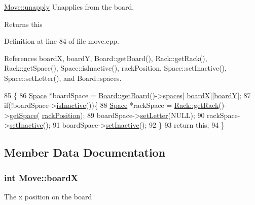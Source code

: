 \hyperlink{class_move_a2ca5c1f8be73c0e6c0ec4b359061a1e2}{Move\-::unapply} Unapplies from the board. 

\begin{DoxyReturn}{Returns}
this 
\end{DoxyReturn}


Definition at line 84 of file move.\-cpp.



References board\-X, board\-Y, Board\-::get\-Board(), Rack\-::get\-Rack(), Rack\-::get\-Space(), Space\-::is\-Inactive(), rack\-Position, Space\-::set\-Inactive(), Space\-::set\-Letter(), and Board\-::spaces.


\begin{DoxyCode}
85 \{
86     \hyperlink{class_space}{Space} *boardSpace = \hyperlink{class_board_ae30e802b1d83309fc95e695b5b3df338}{Board::getBoard}()->\hyperlink{class_board_a73b12248ddb6ee3adc24f4458d8661c2}{spaces}[
      \hyperlink{class_move_ad3fa58a6db17896f2a83cbcc77ceb998}{boardX}][\hyperlink{class_move_ac953ac3b9b8ca529d1be967c7712ae05}{boardY}];
87     \textcolor{keywordflow}{if}(!boardSpace->\hyperlink{class_space_a83819948ab0508299c66829ca8335034}{isInactive}())\{
88         \hyperlink{class_space}{Space} *rackSpace = \hyperlink{class_rack_aa48de650c15bda8267451d84caf6ea3f}{Rack::getRack}()->\hyperlink{class_rack_a2fdfa2264bb85c08ebf107e67cfc8657}{getSpace}(
      \hyperlink{class_move_a8a1c46caedcac551e4a6714b7b729a41}{rackPosition});
89         boardSpace->\hyperlink{class_space_aab86690461768d190a009e06c753f2ce}{setLetter}(NULL);
90         rackSpace->\hyperlink{class_space_a8f6b89f570c1e0ca3c34f19df439a598}{setInactive}();
91         boardSpace->\hyperlink{class_space_a8f6b89f570c1e0ca3c34f19df439a598}{setInactive}();
92     \}
93     \textcolor{keywordflow}{return} \textcolor{keyword}{this};
94 \}
\end{DoxyCode}


\subsection{Member Data Documentation}
\hypertarget{class_move_ad3fa58a6db17896f2a83cbcc77ceb998}{
\subsubsection[{board\-X}]{\setlength{\rightskip}{0pt plus 5cm}int Move\-::board\-X\hspace{0.3cm}{\ttfamily [private]}}}\label{class_move_ad3fa58a6db17896f2a83cbcc77ceb998}
The x position on the board 

